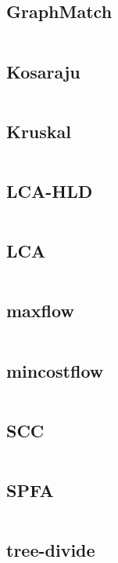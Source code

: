 \documentclass[a4]{article}
\begin{document}
\subsection{GraphMatch}
\inputminted[mathescape,linenos,numbersep=5pt,frame=lines,framesep=2mm]{cpp}{src/graph/GraphMatch.cpp}
\subsection{Kosaraju}
\inputminted[mathescape,linenos,numbersep=5pt,frame=lines,framesep=2mm]{cpp}{src/graph/Kosaraju.cpp}
\subsection{Kruskal}
\inputminted[mathescape,linenos,numbersep=5pt,frame=lines,framesep=2mm]{cpp}{src/graph/Kruskal.cpp}
\subsection{LCA-HLD}
\inputminted[mathescape,linenos,numbersep=5pt,frame=lines,framesep=2mm]{cpp}{src/graph/LCA-HLD.cpp}
\subsection{LCA}
\inputminted[mathescape,linenos,numbersep=5pt,frame=lines,framesep=2mm]{cpp}{src/graph/LCA.cpp}
\subsection{maxflow}
\inputminted[mathescape,linenos,numbersep=5pt,frame=lines,framesep=2mm]{cpp}{src/graph/maxflow.cpp}
\subsection{mincostflow}
\inputminted[mathescape,linenos,numbersep=5pt,frame=lines,framesep=2mm]{cpp}{src/graph/mincostflow.cpp}
\subsection{SCC}
\inputminted[mathescape,linenos,numbersep=5pt,frame=lines,framesep=2mm]{cpp}{src/graph/SCC.cpp}
\subsection{SPFA}
\inputminted[mathescape,linenos,numbersep=5pt,frame=lines,framesep=2mm]{cpp}{src/graph/SPFA.cpp}
\subsection{tree-divide}
\inputminted[mathescape,linenos,numbersep=5pt,frame=lines,framesep=2mm]{cpp}{src/graph/tree-divide.cpp}
\end{document}
